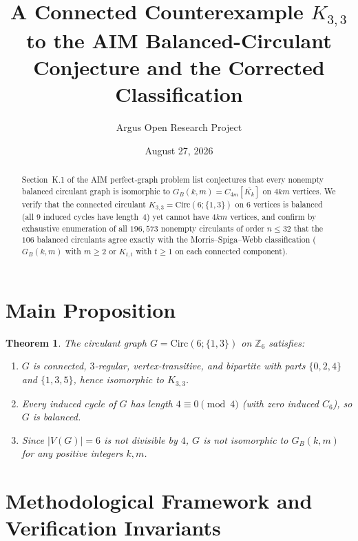 \documentclass[10pt,reqno]{amsart}
\title[The Balanced Circulant $K_{3,3}$ and the Corrected $G_B(k,m)$ Classification]
{A Connected Counterexample $K_{3,3}$ to the AIM Balanced-Circulant Conjecture and the Corrected Classification}
\author{Argus Open Research Project}
\date{August 27, 2026}
\newtheorem{theorem}{Theorem}[section]
\theoremstyle{definition}
\begin{document}
\begin{abstract}
Section~K.1 of the AIM perfect-graph problem list conjectures that every nonempty balanced circulant graph is isomorphic to $G_B(k,m)=C_{4m}[\overline{K_k}]$ on $4km$ vertices. We verify that the connected circulant $K_{3,3}=\mathrm{Circ}(6;\{1,3\})$ on $6$ vertices is balanced (all $9$ induced cycles have length~$4$) yet cannot have $4km$ vertices, and confirm by exhaustive enumeration of all $196{,}573$ nonempty circulants of order $n\le 32$ that the $106$ balanced circulants agree exactly with the Morris--Spiga--Webb classification ($G_B(k,m)$ with $m\ge 2$ or $K_{t,t}$ with $t\ge 1$ on each connected component).
\end{abstract}
\maketitle
\section{Main Proposition}
\begin{theorem}
The circulant graph $G = \mathrm{Circ}(6;\{1,3\})$ on $\mathbb{Z}_6$ satisfies:
\begin{enumerate}[label=\textup{(\arabic*)}]
  \item $G$ is connected, $3$-regular, vertex-transitive, and bipartite with parts $\{0,2,4\}$ and $\{1,3,5\}$, hence isomorphic to $K_{3,3}$.
  \item Every induced cycle of $G$ has length $4\equiv 0\pmod 4$ (with zero induced $C_6$), so $G$ is balanced.
  \item Since $|V(G)|=6$ is not divisible by $4$, $G$ is not isomorphic to $G_B(k,m)$ for any positive integers $k,m$.
\end{enumerate}
\end{theorem}

\section{Methodological Framework and Verification Invariants}
\end{document}
